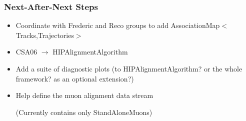 \documentclass[compress]{beamer}
\begin{document}
\begin{frame}
\frametitle{Next-After-Next Steps}
\begin{itemize}\setlength{\itemsep}{0.5 cm}
  \item Coordinate with Frederic and Reco groups to add AssociationMap$<$Tracks,Trajectories$>$

  \item CSA06 $\to$ HIPAlignmentAlgorithm

  \item Add a suite of diagnostic plots (to HIPAlignmentAlgorithm? or the whole framework? as an optional extension?)

  \item Help define the muon alignment data stream

    (Currently contains only StandAloneMuons)
\end{itemize}
\label{numpages}
\end{frame}
\end{document}
